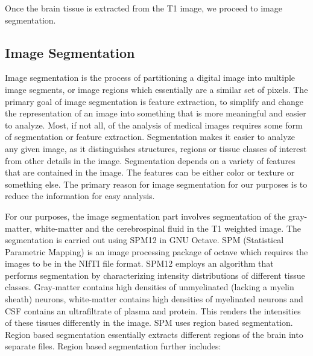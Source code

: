 \documentclass[12pt]{article}
\begin{document}
\begin{table}[H]
\begin{tabular} {| m{3.3cm} | m{11.5cm} | }
    \\ \hline

  \end{tabular}
\end{table}

Once the brain tissue is extracted from the T1 image, we proceed to
image segmentation.

\newpage
\subsection{Image Segmentation}

Image segmentation is the process of partitioning a digital image into
multiple image segments, or image regions which essentially are a
similar set of pixels. The primary goal of image segmentation is
feature extraction, to simplify and change the representation of an
image into something that is more meaningful and easier to analyze.
Most, if not all, of the analysis of medical images requires some form
of segmentation or feature extraction. Segmentation makes it easier
to analyze any given image, as it distinguishes structures, regions or
tissue classes of interest from other details in the image.
Segmentation depends on a variety of features that are contained in
the image. The features can be either color or texture or something
else. The primary reason for image segmentation for our purposes is to
reduce the information for easy analysis.

For our purposes, the image segmentation part involves segmentation of
the gray-matter, white-matter and the cerebrospinal fluid in the T1
weighted image. The segmentation is carried out using SPM12 in GNU
Octave. SPM (Statistical Parametric Mapping) is an image processing
package of octave which  requires the images to be in the NIfTI file
format. SPM12 employs an algorithm that performs segmentation by
characterizing intensity distributions of different tissue classes.
Gray-matter contains high densities of unmyelinated (lacking a myelin
sheath) neurons, white-matter contains high densities of myelinated
neurons and CSF contains an ultrafiltrate of plasma and protein. This
renders the intensities of these tissues differently in the image. SPM
uses region based segmentation. Region based segmentation essentially
extracts different regions of the brain into separate files. Region
based segmentation further includes:
\end{document}
